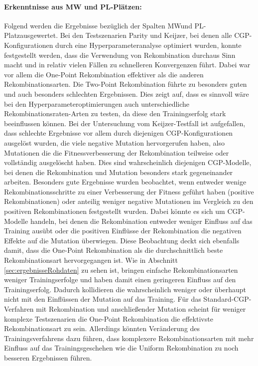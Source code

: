 \paragraph{Erkenntnisse aus MW und PL-Plätzen:}
Folgend werden die Ergebnisse bezüglich der Spalten \glqq MW\grqq\space und \glqq PL-Platz\grqq\space ausgewertet.
Bei den Testszenarien Parity und Keijzer, bei denen alle CGP-Konfigurationen durch eine Hyperparameteranalyse optimiert wurden, konnte festgestellt werden, dass die Verwendung von Rekombination durchaus Sinn macht und in relativ vielen Fällen zu schnelleren Konvergenzen führt.
Dabei war vor allem die One-Point Rekombination effektiver als die anderen Rekombinationsarten.
Die Two-Point Rekombination führte zu besonders guten und auch besonders schlechten Ergebnissen.
Dies zeigt auf, dass es sinnvoll wäre bei den Hyperparameteroptimierungen auch unterschiedliche Rekombinationsraten-Arten zu testen, da diese den Trainingserfolg stark beeinflussen können.
Bei der Untersuchung vom Keijzer-Testfall ist aufgefallen, dass schlechte Ergebnisse vor allem durch diejenigen CGP-Konfigurationen ausgelöst wurden, die viele negative Mutation hervorgerufen haben, also Mutationen die die Fitnessverbesserung der Rekombination teilweise oder vollständig ausgelöscht haben.
Dies sind wahrscheinlich diejenigen CGP-Modelle, bei denen die Rekombination und Mutation besonders stark gegeneinander arbeiten.
Besonders gute Ergebnisse wurden beobachtet, wenn entweder wenige Rekombinationsschritte zu einer Verbesserung der Fitness geführt haben (positive Rekombinationen) oder anteilig weniger negative Mutationen im Vergleich zu den positiven Rekombinationen festgestellt wurden.
Dabei könnte es sich um CGP-Modelle handeln, bei denen die Rekombination entweder weniger Einfluss auf das Training ausübt oder die positiven Einflüsse der Rekombination die negativen Effekte auf die Mutation überwiegen.
Diese Beobachtung deckt sich ebenfalls damit, dass die One-Point Rekombination als die durchschnittlich beste Rekombinationsart hervorgegangen ist.
Wie in Abschnitt \ref{sec:ergebnisseRohdaten} zu sehen ist, bringen einfache Rekombinationsarten weniger Trainingserfolge und haben damit einen geringeren Einfluss auf den Trainingserfolg.
Dadurch kollidieren die wahrscheinlich weniger oder überhaupt nicht mit den Einflüssen der Mutation auf das Training.
Für das Standard-CGP-Verfahren mit Rekombination und anschließender Mutation scheint für weniger komplexe Testszenarien die One-Point Rekombination die effektivste Rekombinationsart zu sein.
Allerdings könnten Veränderung des Trainingsverfahrens dazu führen, dass komplexere Rekombinationsarten mit mehr Einfluss auf das Trainingsgeschehen wie die Uniform Rekombination zu noch besseren Ergebnissen führen.\\
